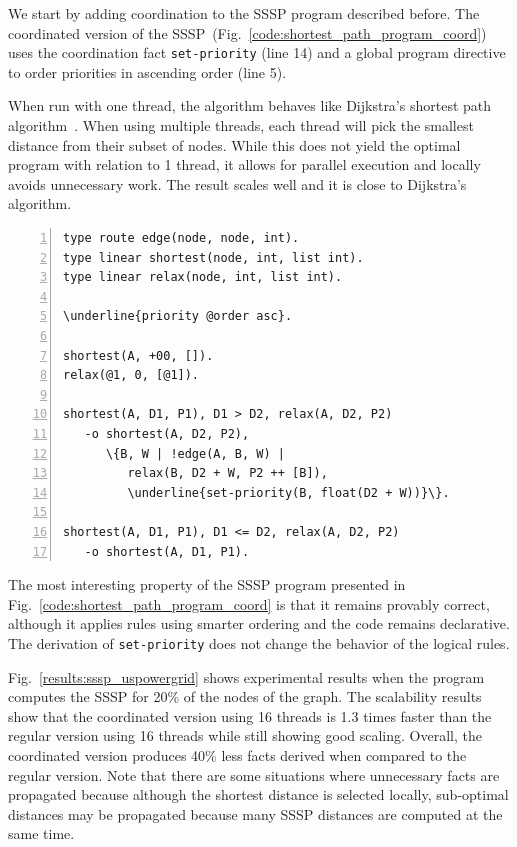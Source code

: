 We start by adding coordination to the SSSP program described before.
The coordinated version of the
SSSP~(Fig.~\ref{code:shortest_path_program_coord}) uses the coordination fact
\texttt{set-priority} (line 14) and a global program directive to order
priorities in ascending order (line 5).

When run with one thread, the algorithm behaves like
Dijkstra's shortest path algorithm~\cite{Dijkstra}. When using multiple
threads, each thread will pick the smallest distance from their subset of nodes.
While this does not yield the optimal program with relation to 1 thread, it
allows for parallel execution and locally avoids unnecessary work. The result
scales well and it is close to Dijkstra's algorithm.

\begin{topfig}
\scriptsize\begin{Verbatim}[numbers=left,commandchars=\\\{\}]
type route edge(node, node, int).
type linear shortest(node, int, list int).
type linear relax(node, int, list int).

\underline{priority @order asc}.

shortest(A, +00, []).
relax(@1, 0, [@1]).

shortest(A, D1, P1), D1 > D2, relax(A, D2, P2)
   -o shortest(A, D2, P2),
      \{B, W | !edge(A, B, W) |
         relax(B, D2 + W, P2 ++ [B]),
         \underline{set-priority(B, float(D2 + W))}\}.

shortest(A, D1, P1), D1 <= D2, relax(A, D2, P2)
   -o shortest(A, D1, P1).
\end{Verbatim}
\end{topfig}
\normalsize

The most interesting property of the SSSP program presented in
Fig.~\ref{code:shortest_path_program_coord} is that it remains provably correct,
although it applies rules using smarter ordering and the code remains
declarative. The derivation of \texttt{set-priority} does not change the
behavior of the logical rules.

Fig.~\ref{results:sssp_uspowergrid} shows experimental results when the
program computes the SSSP for 20\% of the nodes of the graph.
The scalability results show that the coordinated
version using 16 threads is 1.3 times faster than the regular version using 16
threads while still showing good scaling. Overall, the coordinated version produces 40\% less facts
derived when compared to the regular version.
Note that there are some situations where unnecessary facts are propagated
because although the shortest distance is selected locally, sub-optimal distances may be
propagated because many SSSP distances are computed at the same time.

